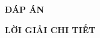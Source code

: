 
\newpage
\setcounter{page}{1}
\begin{center}
{\bf\Large ĐÁP ÁN}\vspace{12pt}
\begin{multicols}{10}

\end{multicols}
\end{center}
\newpage
\setcounter{page}{1}
\begin{center}
{\bf\Large LỜI GIẢI CHI TIẾT}
\end{center}


